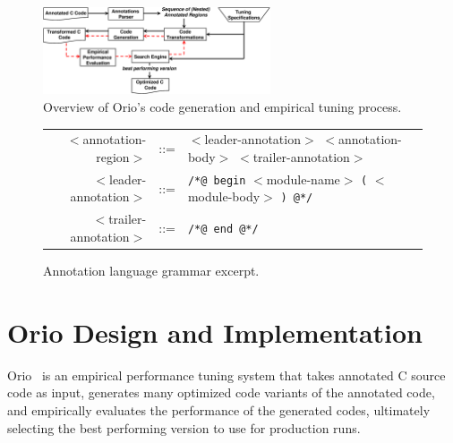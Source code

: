 
\begin{figure}%
\begin{center}
\includegraphics[width=0.6\textwidth]{figures/orio.eps}   
\end{center}
\caption{Overview of Orio's code generation and empirical tuning process.}  
\label{fig:orio}
\end{figure}  

\begin{figure}%
\begin{center} 
\begin{tabular}{rrl} 
$<$annotation-region$>$ & ::= & $<$leader-annotation$>$ $<$annotation-body$>$ $<$trailer-annotation$>$\\ 
$<$leader-annotation$>$ & ::= & \texttt{/*@ begin} $<$module-name$>$ \texttt{(} $<$module-body$>$ \texttt{) @*/} \\
$<$trailer-annotation$>$ & ::= & \texttt{/*@ end @*/} \\
\end{tabular} 
\end{center}  
\caption{Annotation language grammar excerpt.}  
\label{fig:ann-lang}
\end{figure}  

\section{Orio Design and Implementation}
\label{sec:implm}

Orio~\cite{OrioURL} is an empirical performance tuning system that takes
annotated C source code as input, generates many optimized code variants of
the annotated code, and empirically evaluates the performance of the
generated codes, ultimately selecting the best performing version to use for
production runs.

